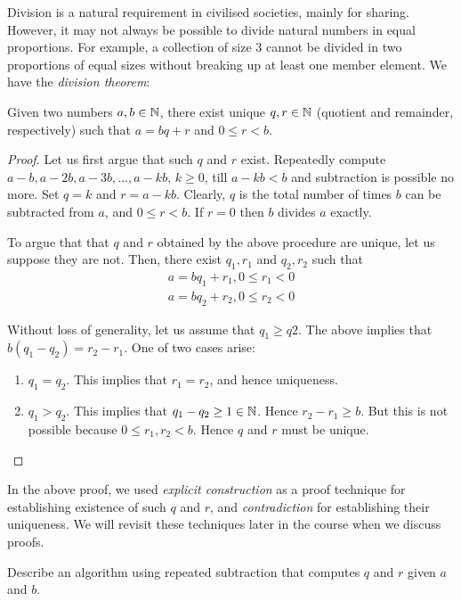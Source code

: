 Division is a natural requirement in civilised societies, mainly for sharing. However, it may not always be possible to divide natural numbers in equal proportions. For example, a collection of size 3 cannot be divided in two proportions of equal sizes without breaking up at least one member element. We have the {\em division theorem}:
\begin{theorem}
Given two numbers $a,b \in \mathbb{N}$, there exist unique $q,r \in \mathbb{N}$ (quotient and remainder, respectively)  such that $a = bq + r$ and $0 \leq r < b$. 
\end{theorem}
\begin{proof}
Let us first argue that such $q$ and $r$ exist. Repeatedly compute $a - b,a - 2b, a - 3b, \ldots, a - kb$, $k \geq 0$, till $a - kb  <  b$ and subtraction is possible no more.  Set $q = k$ and $r = a -kb$. Clearly, $q$ is the total number of times $b$ can be subtracted from $a$, and $0 \leq r < b$. If $r=0$ then $b$ divides $a$ exactly.

To argue that that $q$ and $r$ obtained by the above procedure are unique, let us suppose they are not. Then, there exist $q_1,r_1$ and $q_2,r_2$ such that
\[
\begin{array}{l}
a = bq_1 + r_1, 0 \leq r_1 < 0 \\
a = bq_2 + r_2, 0 \leq r_2 < 0 
\end{array}
\]

Without loss of generality, let us assume that  $q_1 \geq q2$. The above implies that $b(q_1 - q_2) = r_2 - r_1$. One of two cases arise:
\begin{enumerate}
\item $q_1 = q_2$. This implies that $r_1 = r_2$, and hence uniqueness.
\item $q_1 > q_2$. This implies that $q_1 - q_2 \geq 1 \in \mathbb{N}$. Hence $r_2 - r_1 \geq b$. But this is not possible because $0 \leq r_1,r_2 < b$. Hence $q$ and $r$ must be unique.
\end{enumerate}
\end{proof}

In the above proof, we used {\em explicit construction} as a proof technique for establishing existence of such $q$ and $r$, and {\em contradiction} for establishing their uniqueness.  We will revisit these techniques later in the course when we discuss proofs.

\begin{exercise}
Describe an algorithm using repeated subtraction that computes $q$ and $r$ given $a$ and $b$.
\end{exercise}

